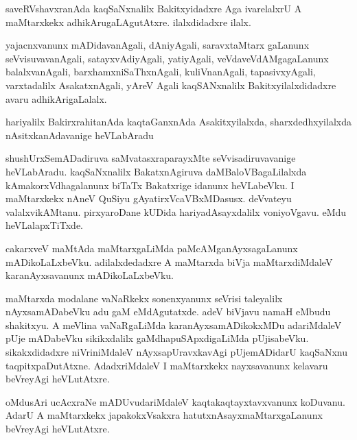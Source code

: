 \documentclass{article}
\begin{document}
\begin{mn}%
saveRVshavxranAda kaqSaNxnalilx Bakitxyidadxre Aga ivarelalxrU A maMtarxkekx 
adhikArugaLAgutAtxre. ilalxdidadxre ilalx.
\end{mn}

\begin{mn}%
yajacnxvanunx mADidavanAgali, dAniyAgali, saravxtaMtarx gaLanunx seVvisuvavanAgali, 
satayxvAdiyAgali, yatiyAgali, veVdaveVdAMgagaLanunx balalxvanAgali, 
barxhamxniSaThxnAgali, kuliVnanAgali, tapasivxyAgali, varxtadalilx AsakatxnAgali, yAreV 
Agali kaqSANxnalilx Bakitxyilalxdidadxre avaru adhikArigaLalalx.
\end{mn}

\begin{mn}%
hariyalilx BakirxrahitanAda kaqtaGanxnAda Asakitxyilalxda, sharxdedhxyilalxda 
nAsitxkanAdavanige heVLabAradu
\end{mn}

\begin{mn}%
shushUrxSemADadiruva saMvatasxraparayxMte seVvisadiruvavanige heVLabAradu. kaqSaNxnalilx 
BakatxnAgiruva  daMBaloVBagaLilalxda kAmakorxVdhagalanunx biTaTx Bakatxrige idanunx 
heVLabeVku. I maMtarxkekx nAneV QuSiyu gAyatirxVcaVBxMDasusx. deVvateyu valalxvikAMtanu. 
pirxyaroDane kUDida hariyadAsayxdalilx voniyoVgavu. eMdu heVLalapxTiTxde.
\end{mn}

\begin{mn}%
cakarxveV maMtAda maMtarxgaLiMda paMcAMganAyxsagaLanunx mADikoLaLxbeVku. adilalxdedadxre A  
maMtarxda biVja maMtarxdiMdaleV karanAyxsavanunx mADikoLaLxbeVku.
\end{mn}

\begin{mn}%
maMtarxda modalane vaNaRkekx sonenxyanunx seVrisi taleyalilx nAyxsamADabeVku adu gaM 
eMdAgutatxde. adeV biVjavu namaH eMbudu shakitxyu. A meVlina vaNaRgaLiMda 
karanAyxsamADikokxMDu adariMdaleV pUje mADabeVku sikikxdalilx gaMdhapuSApxdigaLiMda 
pUjisabeVku. sikakxdidadxre niVriniMdaleV nAyxsapUravxkavAgi pUjemADidarU kaqSaNxnu 
taqpitxpaDutAtxne. AdadxriMdaleV I maMtarxkekx nayxsavanunx kelavaru beVreyAgi heVLutAtxre.
\end{mn}

\begin{mn}%
oMdusAri ucAcxraNe mADUvudariMdaleV kaqtakaqtayxtavxvanunx koDuvanu. AdarU A maMtarxkekx 
japakokxVsakxra hatutxnAsayxmaMtarxgaLanunx beVreyAgi heVLutAtxre.
\end{mn}
\end{document}
